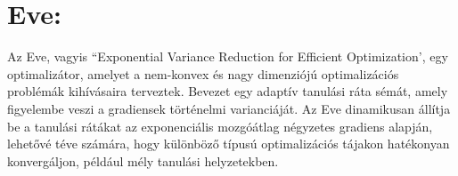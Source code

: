 \documentclass{article}
\begin{document}
\section*{Eve:}
Az Eve, vagyis ``Exponential Variance Reduction for Efficient Optimization', egy optimalizátor, amelyet a nem-konvex és nagy dimenziójú optimalizációs problémák kihívásaira terveztek. Bevezet egy adaptív tanulási ráta sémát, amely figyelembe veszi a gradiensek történelmi varianciáját. Az Eve dinamikusan állítja be a tanulási rátákat az exponenciális mozgóátlag négyzetes gradiens alapján, lehetővé téve számára, hogy különböző típusú optimalizációs tájakon hatékonyan konvergáljon, például mély tanulási helyzetekben.
\end{document}
